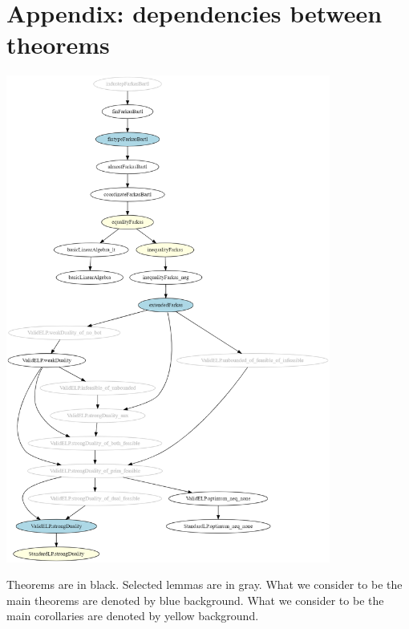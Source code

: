 \documentclass[]{article}
\renewcommand{\.}{\hskip .75pt}
\begin{document}
\section*{Appendix: dependencies between theorems}

\includegraphics[width=0.8\textwidth]{theorems.png}

\noindent
Theorems are in black. Selected lemmas are in gray.
What we consider to be the main theorems are
denoted by blue background.
What we consider to be the main corollaries are
denoted by yellow background.
\end{document}
